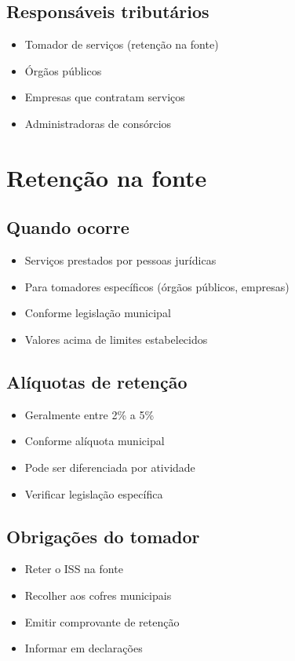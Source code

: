 \documentclass[12pt,a4paper]{article}
\begin{document}
\subsection{Responsáveis tributários}
\begin{itemize}
    \item Tomador de serviços (retenção na fonte)
    \item Órgãos públicos
    \item Empresas que contratam serviços
    \item Administradoras de consórcios
\end{itemize}

\section{Retenção na fonte}

\subsection{Quando ocorre}
\begin{itemize}
    \item Serviços prestados por pessoas jurídicas
    \item Para tomadores específicos (órgãos públicos, empresas)
    \item Conforme legislação municipal
    \item Valores acima de limites estabelecidos
\end{itemize}

\subsection{Alíquotas de retenção}
\begin{itemize}
    \item Geralmente entre 2\% a 5\%
    \item Conforme alíquota municipal
    \item Pode ser diferenciada por atividade
    \item Verificar legislação específica
\end{itemize}

\subsection{Obrigações do tomador}
\begin{itemize}
    \item Reter o ISS na fonte
    \item Recolher aos cofres municipais
    \item Emitir comprovante de retenção
    \item Informar em declarações
\end{itemize}
\end{document}
